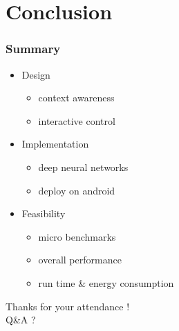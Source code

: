 \section{Conclusion}

\begin{frame}
\frametitle{Summary}
\begin{itemize}
\item Design
\begin{itemize}
    \item context awareness
    \item interactive control
\end{itemize}

\item Implementation
\begin{itemize}
    \item deep neural networks
    \item deploy on android
\end{itemize}

\item Feasibility
\begin{itemize}
    \item micro benchmarks
    \item overall performance
    \item run time \& energy consumption
\end{itemize}


\end{itemize}

\end{frame}



\begin{frame}
\begin{center}
\huge
Thanks for your attendance ! \\
Q\&A ?
\end{center}

\end{frame}
